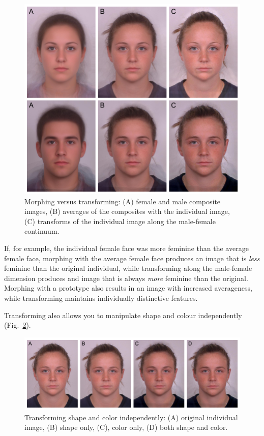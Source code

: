 \documentclass[
  man,floatsintext]{apa6}
\begin{document}
\begin{figure}
\includegraphics[width=0.75\linewidth]{index_files/figure-latex/trans-vs-morph-1} \caption{Morphing versus transforming: (A) female and male composite images, (B) averages of the composites with the individual image, (C) transforms of the individual image along the male-female continuum.}\label{fig:trans-vs-morph}
\end{figure}

If, for example, the individual female face was more feminine than the average female face, morphing with the average female face produces an image that is \emph{less} feminine than the original individual, while transforming along the male-female dimension produces and image that is always \emph{more} feminine than the original. Morphing with a prototype also results in an image with increased averageness, while transforming maintains individually distinctive features.

Transforming also allows you to manipulate shape and colour independently (Fig.~\ref{fig:trans-shape-color}).

\begin{figure}
\includegraphics[width=1\linewidth]{index_files/figure-latex/trans-shape-color-1} \caption{Transforming shape and color independently: (A) original individual image, (B) shape only, (C), color only, (D) both shape and color.}\label{fig:trans-shape-color}
\end{figure}
\end{document}
